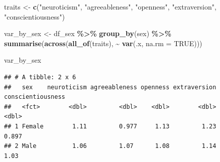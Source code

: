 \documentclass[
]{article}
\newenvironment{Shaded}{\begin{snugshade}}{\end{snugshade}}
\newcommand{\AttributeTok}[1]{\textcolor[rgb]{0.13,0.29,0.53}{#1}}
\newcommand{\ConstantTok}[1]{\textcolor[rgb]{0.56,0.35,0.01}{#1}}
\newcommand{\ControlFlowTok}[1]{\textcolor[rgb]{0.13,0.29,0.53}{\textbf{#1}}}
\newcommand{\DecValTok}[1]{\textcolor[rgb]{0.00,0.00,0.81}{#1}}
\newcommand{\FunctionTok}[1]{\textcolor[rgb]{0.13,0.29,0.53}{\textbf{#1}}}
\newcommand{\NormalTok}[1]{#1}
\newcommand{\OtherTok}[1]{\textcolor[rgb]{0.56,0.35,0.01}{#1}}
\newcommand{\SpecialCharTok}[1]{\textcolor[rgb]{0.81,0.36,0.00}{\textbf{#1}}}
\newcommand{\StringTok}[1]{\textcolor[rgb]{0.31,0.60,0.02}{#1}}
\begin{document}
\begin{Shaded}
\begin{Highlighting}[]
\NormalTok{traits }\OtherTok{\textless{}{-}} \FunctionTok{c}\NormalTok{(}\StringTok{"neuroticism"}\NormalTok{, }\StringTok{"agreeableness"}\NormalTok{, }\StringTok{"openness"}\NormalTok{, }\StringTok{"extraversion"}\NormalTok{, }\StringTok{"conscientiousness"}\NormalTok{)}

\NormalTok{var\_by\_sex }\OtherTok{\textless{}{-}}\NormalTok{ df\_sex }\SpecialCharTok{\%\textgreater{}\%}
  \FunctionTok{group\_by}\NormalTok{(sex) }\SpecialCharTok{\%\textgreater{}\%}
  \FunctionTok{summarise}\NormalTok{(}\FunctionTok{across}\NormalTok{(}\FunctionTok{all\_of}\NormalTok{(traits), }\SpecialCharTok{\textasciitilde{}} \FunctionTok{var}\NormalTok{(.x, }\AttributeTok{na.rm =} \ConstantTok{TRUE}\NormalTok{))) }

\NormalTok{var\_by\_sex}
\end{Highlighting}
\end{Shaded}

\begin{verbatim}
## # A tibble: 2 x 6
##   sex    neuroticism agreeableness openness extraversion conscientiousness
##   <fct>        <dbl>         <dbl>    <dbl>        <dbl>             <dbl>
## 1 Female        1.11         0.977     1.13         1.23             0.897
## 2 Male          1.06         1.07      1.08         1.14             1.03
\end{verbatim}

\begin{Shaded}
\end{Shaded}
\end{document}
